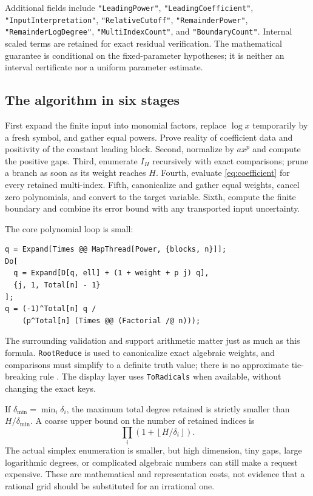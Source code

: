 \documentclass[11pt,a4paper]{article}
\numberwithin{equation}{section}
\theoremstyle{definition}
\theoremstyle{remark}
\begin{document}
Additional fields include \texttt{"LeadingPower"},
\texttt{"LeadingCoefficient"}, \texttt{"InputInterpretation"},
\texttt{"RelativeCutoff"}, \texttt{"RemainderPower"},
\texttt{"RemainderLogDegree"}, \texttt{"MultiIndexCount"}, and
\texttt{"BoundaryCount"}. Internal scaled terms are retained for exact
residual verification. The mathematical guarantee is conditional on the
fixed-parameter hypotheses; it is neither an interval certificate nor a
uniform parameter estimate.

\subsection{The algorithm in six stages}

First expand the finite input into monomial factors, replace
$\log x$ temporarily by a fresh symbol, and gather equal powers.
Prove reality of coefficient data and positivity of the constant leading
block. Second, normalize by $a x^p$ and compute the positive gaps.
Third, enumerate $I_H$ recursively with exact comparisons; prune a branch
as soon as its weight reaches $H$. Fourth, evaluate
\eqref{eq:coefficient} for every retained multi-index. Fifth, canonicalize
and gather equal weights, cancel zero polynomials, and convert to the target
variable. Sixth, compute the finite boundary and combine its error bound
with any transported input uncertainty.

The core polynomial loop is small:
\begin{lstlisting}
q = Expand[Times @@ MapThread[Power, {blocks, n}]];
Do[
  q = Expand[D[q, ell] + (1 + weight + p j) q],
  {j, 1, Total[n] - 1}
];
q = (-1)^Total[n] q /
    (p^Total[n] (Times @@ (Factorial /@ n)));
\end{lstlisting}
The surrounding validation and support arithmetic matter just as much as
this formula. \texttt{RootReduce} is used to canonicalize exact algebraic
weights, and comparisons must simplify to a definite truth value; there is
no approximate tie-breaking rule \cite{wlrootreduce}. The display layer
uses \texttt{ToRadicals} when available, without changing the exact keys.

If $\delta_{\min}=\min_i\delta_i$, the maximum total degree retained is
strictly smaller than $H/\delta_{\min}$. A coarse upper bound on the number
of retained indices is
\[
 \prod_i\left(1+\left\lfloor H/\delta_i\right\rfloor\right).
\]
The actual simplex enumeration is smaller, but high dimension, tiny gaps,
large logarithmic degrees, or complicated algebraic numbers can still make
a request expensive. These are mathematical and representation costs, not
evidence that a rational grid should be substituted for an irrational one.
\end{document}
